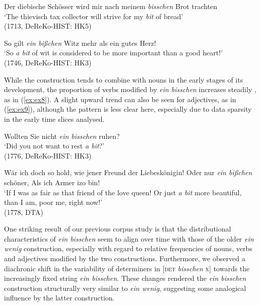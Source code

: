 \documentclass[output=paper]{langsci/langscibook}
\begin{document}
\begin{exe}
	\ex \label{ex:ex6}   Der diebische Schösser wird mir nach meinem \textit{bisschen} Brot 	trachten  \\
	‘The thievisch tax collector will strive for my \textit{bit} of bread’  \\	(1713, DeReKo-HIST: HK5)

	\ex \label{ex:ex7}   So gilt \textit{ein bißchen} Witz mehr als ein gutes Herz! \\
	‘So \textit{a bit} of wit is considered to be more important than a good 	heart!’ \\ (1746, DeReKo-HIST: HK3) 
\end{exe}

While the construction tends to combine with nouns in the early stages of its development, the proportion of verbs modified by \textit{ein bisschen} increases steadily {\citep[150]{NeelsReductionexpansionbit2018}}, as in (\ref{ex:ex8}). A slight upward trend can also be seen for adjectives, as in (\ref{ex:ex9}), although the pattern is less clear here, especially due to data sparsity in the early time slices analysed.

\begin{exe}
	\ex \label{ex:ex8}   Wollten Sie nicht \textit{ein bisschen} ruhen? \\
	‘Did you not want to rest \textit{a bit}?’ \\ (1776, DeReKo-HIST: HK3)

	\ex \label{ex:ex9}   Wär ich doch so hold, wie jener Freund der Liebeskönigin!	Oder nur \textit{ein bißchen} schöner, Als ich Armer izo bin! \\
	‘If I was as fair as that friend of the love queen! Or just \textit{a bit }	more beautiful, than I am, poor me, right now!’ \\ (1778, DTA)
\end{exe}

One striking result of our previous corpus study is that the distributional characteristics of \textit{ein bisschen} seem to align over time with those of the older \textit{ein wenig} construction, especially with regard to relative frequencies of nouns, verbs and adjectives modified by the two constructions. Furthermore, we observed a diachronic shift in the variability of determiners in [\textsc{det} \textit{bisschen} \textsc{x}] towards the increasingly fixed string \textit{ein bisschen}. These changes rendered the \textit{ein bisschen} construction structurally very similar to \textit{ein wenig}, suggesting some analogical influence by the latter construction. 
\end{document}
